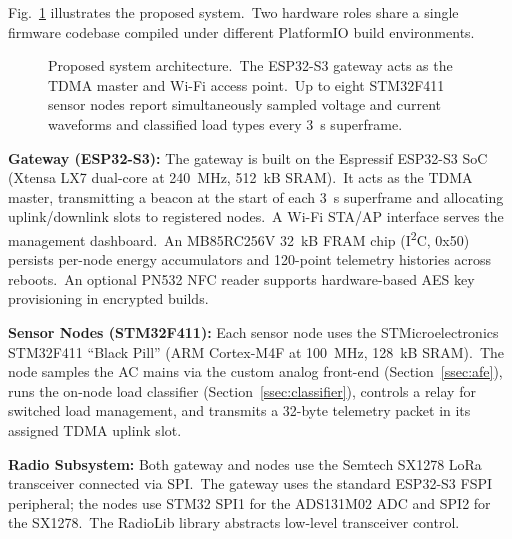 \documentclass[conference]{IEEEtran}
\begin{document}
Fig.\ \ref{fig:arch} illustrates the proposed system.\ Two hardware
roles share a single firmware codebase compiled under different
PlatformIO build environments.

\begin{figure}[t]
  \centering
  \caption{Proposed system architecture.\ The ESP32-S3 gateway acts
    as the TDMA master and Wi-Fi access point.\ Up to eight
    STM32F411 sensor nodes report simultaneously sampled voltage and
    current waveforms and classified load types every 3~s superframe.}
  \label{fig:arch}
\end{figure}

\textbf{Gateway (ESP32-S3):} The gateway is built on the Espressif
ESP32-S3 SoC (Xtensa LX7 dual-core at 240~MHz, 512~kB SRAM).\ It
acts as the TDMA master, transmitting a beacon at the start of each
3~s superframe and allocating uplink/downlink slots to registered
nodes.\ A Wi-Fi STA/AP interface serves the management dashboard.\ An
MB85RC256V 32~kB FRAM chip (I\textsuperscript{2}C, 0x50) persists
per-node energy accumulators and 120-point telemetry histories across
reboots.\ An optional PN532 NFC reader supports hardware-based AES key
provisioning in encrypted builds.

\textbf{Sensor Nodes (STM32F411):} Each sensor node uses the
STMicroelectronics STM32F411 ``Black Pill'' (ARM Cortex-M4F at
100~MHz, 128~kB SRAM).\ The node samples the AC mains via the custom
analog front-end (Section~\ref{ssec:afe}), runs the on-node load
classifier (Section~\ref{ssec:classifier}), controls a relay for
switched load management, and transmits a 32-byte telemetry packet in
its assigned TDMA uplink slot.

\textbf{Radio Subsystem:} Both gateway and nodes use the Semtech
SX1278 LoRa transceiver connected via SPI.\ The gateway uses the
standard ESP32-S3 FSPI peripheral; the nodes use STM32 SPI1 for the
ADS131M02 ADC and SPI2 for the SX1278.\ The RadioLib library
\cite{radiolib} abstracts low-level transceiver control.
\end{document}
